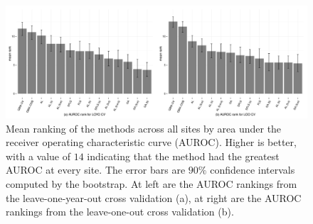 \documentclass[authoryear,review, 12pt]{elsarticle}
\begin{document}
\begin{figure}
\includegraphics[width=\textwidth]{fig2/auroc-rank.PDF}
\caption{Mean ranking of the methods across all sites by area
under the receiver operating characteristic curve (AUROC). Higher is better, with a value of \(14\) indicating that the method had the greatest AUROC at every site. The error bars are
\(90\%\) confidence intervals computed by the bootstrap. At left are the
AUROC rankings from the leave-one-year-out cross validation (a), at
right are the AUROC rankings from the leave-one-out cross validation
(b).}
\end{figure}
\end{document}
